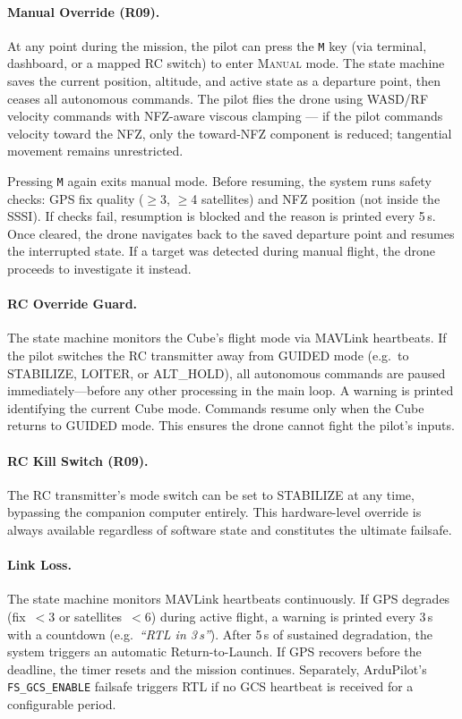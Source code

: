 \paragraph{Manual Override (R09).}
At any point during the mission, the pilot can press the \texttt{M} key (via terminal, dashboard, or a mapped RC switch) to enter \textsc{Manual} mode.  The state machine saves the current position, altitude, and active state as a departure point, then ceases all autonomous commands.  The pilot flies the drone using WASD/RF velocity commands with NFZ-aware viscous clamping --- if the pilot commands velocity toward the NFZ, only the toward-NFZ component is reduced; tangential movement remains unrestricted.

Pressing \texttt{M} again exits manual mode.  Before resuming, the system runs safety checks: GPS fix quality ($\geq$3, $\geq$4 satellites) and NFZ position (not inside the SSSI).  If checks fail, resumption is blocked and the reason is printed every 5\,s.  Once cleared, the drone navigates back to the saved departure point and resumes the interrupted state.  If a target was detected during manual flight, the drone proceeds to investigate it instead.

\paragraph{RC Override Guard.}
The state machine monitors the Cube's flight mode via MAVLink heartbeats.  If the pilot switches the RC transmitter away from GUIDED mode (e.g.\ to STABILIZE, LOITER, or ALT\_HOLD), all autonomous commands are paused immediately---before any other processing in the main loop.  A warning is printed identifying the current Cube mode.  Commands resume only when the Cube returns to GUIDED mode.  This ensures the drone cannot fight the pilot's inputs.

\paragraph{RC Kill Switch (R09).}
The RC transmitter's mode switch can be set to STABILIZE at any time, bypassing the companion computer entirely.  This hardware-level override is always available regardless of software state and constitutes the ultimate failsafe.

\paragraph{Link Loss.}
The state machine monitors MAVLink heartbeats continuously.  If GPS degrades (fix~$<$3 or satellites~$<$6) during active flight, a warning is printed every 3\,s with a countdown (e.g.\ \textit{``RTL in 3\,s''}).  After 5\,s of sustained degradation, the system triggers an automatic Return-to-Launch.  If GPS recovers before the deadline, the timer resets and the mission continues.  Separately, ArduPilot's \texttt{FS\_GCS\_ENABLE} failsafe triggers RTL if no GCS heartbeat is received for a configurable period.

